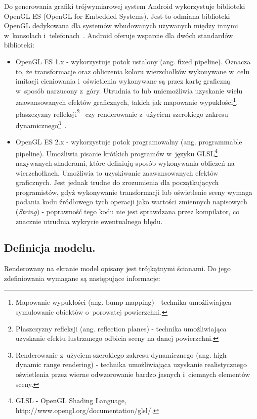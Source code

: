 \documentclass[a4paper,twocolumn,11pt]{article}
\begin{document}
Do generowania grafiki trójwymiarowej system Android wykorzystuje biblioteki OpenGL ES (OpenGL for Embedded Systems).
Jest to odmiana biblioteki OpenGL dedykowana dla systemów wbudowanych używanych między innymi w~konsolach i~telefonach~\cite{ogl:es}.
Android oferuje wsparcie dla dwóch standardów biblioteki:

\begin{itemize}
 \item OpenGL ES 1.x - wykorzystuje potok ustalony (ang. fixed pipeline).
  Oznacza to, że transformacje oraz obliczenia koloru wierzchołków wykonywane w~celu imitacji cieniowania i~oświetlenia wykonywane są przez kartę graficzną w~sposób narzucony z~góry.
  Utrudnia to lub uniemożliwia uzyskanie wielu zaawansowanych efektów graficznych, takich jak mapowanie wypukłości\footnote{Mapowanie wypukłości (ang. bump mapping) - technika umożliwiająca symulowanie obiektów o~porowatej powierzchni.}, płaszczyzny refleksji\footnote{Płaszczyzny refleksji (ang. reflection planes) - technika umożliwiająca uzyskanie efektu lustrzanego odbicia sceny na danej powierzchni.}~\cite{tec:3d} czy renderowanie z~użyciem szerokiego zakresu dynamicznego\footnote{Renderowanie z~użyciem szerokiego zakresu dynamicznego (ang. high dynamic range rendering) - technika umożliwiająca uzyskanie realistycznego oświetlenia przez wierne odwzorowanie bardzo jasnych i~ciemnych elementów sceny.}~\cite{nvi:hdr}. 
 \item OpenGL ES 2.x - wykorzystuje potok programowalny (ang. programmable pipeline).
  Umożliwia pisanie krótkich programów w~języku GLSL\footnote{GLSL - OpenGL Shading Language, http://www.opengl.org/documentation/glsl/.} nazywanych shaderami, które definiują sposób wykonywania obliczeń na wierzchołkach.
  Umożliwia to uzyskiwanie zaawansowanych efektów graficznych. Jest jednak trudne do zrozumienia dla początkujących programistów, gdyż wykonywanie transformacji lub oświetlenie sceny wymaga podania kodu źródłowego tych operacji jako wartości zmiennych napisowych (\emph{String}) - poprawność tego kodu nie jest sprawdzana przez kompilator, co znacznie utrudnia wykrycie ewentualnego błędu.
\end{itemize}


\subsection{Definicja modelu.}
 Renderowany na ekranie model opisany jest trójkątnymi ścianami.
 Do jego zdefiniowania wymagane są następujące informacje:
\end{document}
